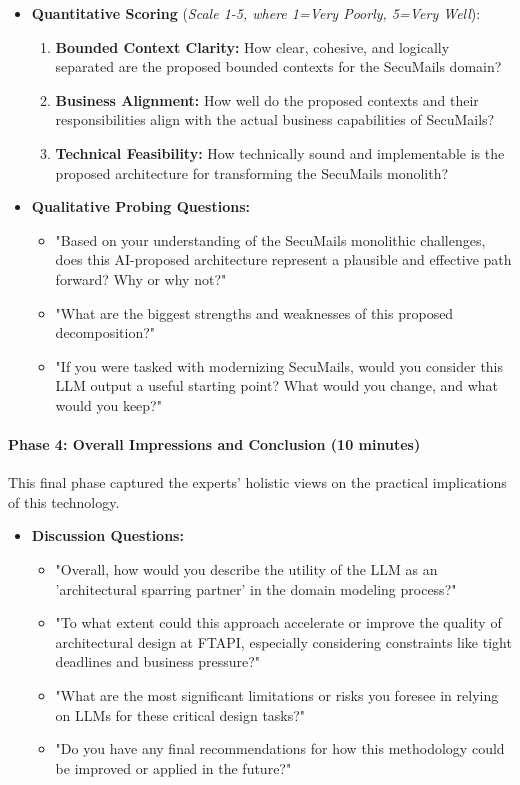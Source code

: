 \begin{itemize}
    \item \textbf{Quantitative Scoring} (\textit{Scale 1-5, where 1=Very Poorly, 5=Very Well}):
    \begin{enumerate}
        \item \textbf{Bounded Context Clarity:} How clear, cohesive, and logically separated are the proposed bounded contexts for the SecuMails domain?
        \item \textbf{Business Alignment:} How well do the proposed contexts and their responsibilities align with the actual business capabilities of SecuMails?
        \item \textbf{Technical Feasibility:} How technically sound and implementable is the proposed architecture for transforming the SecuMails monolith?
    \end{enumerate}
    \item \textbf{Qualitative Probing Questions:}
    \begin{itemize}
        \item "Based on your understanding of the SecuMails monolithic challenges, does this AI-proposed architecture represent a plausible and effective path forward? Why or why not?"
        \item "What are the biggest strengths and weaknesses of this proposed decomposition?"
        \item "If you were tasked with modernizing SecuMails, would you consider this LLM output a useful starting point? What would you change, and what would you keep?"
    \end{itemize}
\end{itemize}

\paragraph{Phase 4: Overall Impressions and Conclusion (10 minutes)}
This final phase captured the experts' holistic views on the practical implications of this technology.

\begin{itemize}
    \item \textbf{Discussion Questions:}
    \begin{itemize}
        \item "Overall, how would you describe the utility of the LLM as an 'architectural sparring partner' in the domain modeling process?"
        \item "To what extent could this approach accelerate or improve the quality of architectural design at FTAPI, especially considering constraints like tight deadlines and business pressure?"
        \item "What are the most significant limitations or risks you foresee in relying on LLMs for these critical design tasks?"
        \item "Do you have any final recommendations for how this methodology could be improved or applied in the future?"
    \end{itemize}
\end{itemize}
